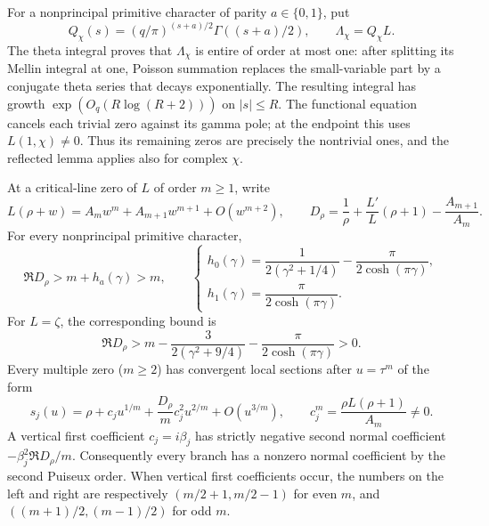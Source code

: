 For a nonprincipal primitive character of parity $a\in\{0,1\}$,
put
\[
 Q_\chi(s)=(q/\pi)^{(s+a)/2}\Gamma((s+a)/2),\qquad
 \Lambda_\chi=Q_\chi L.
\]
The theta integral proves that $\Lambda_\chi$ is entire of
order at most one: after splitting its Mellin integral at one,
Poisson summation replaces the small-variable part by a conjugate
theta series that decays exponentially. The resulting integral
has growth $\exp(O_q(R\log(R+2)))$ on $|s|\le R$.
The functional equation cancels each trivial zero against its
gamma pole; at the endpoint this uses $L(1,\chi)\ne0$.
Thus its remaining zeros are precisely the nontrivial ones,
and the reflected lemma applies also for complex $\chi$.

\begin{proposition}
\label{prop:motion-second-jet}
At a critical-line zero of $L$ of order $m\ge1$, write
\[
 L(\rho+w)=A_mw^m+A_{m+1}w^{m+1}+O(w^{m+2}),\qquad
 D_\rho=\frac1\rho+\frac{L'}L(\rho+1)-\frac{A_{m+1}}{A_m}.
\]
For every nonprincipal primitive character,
\begin{equation}\label{eq:dirichlet-bending-positive-new}
 \Re D_\rho>m+h_a(\gamma)>m,
 \qquad
 \begin{cases}
 h_0(\gamma)=\dfrac1{2(\gamma^2+1/4)}
                  -\dfrac\pi{2\cosh(\pi\gamma)},\\[4pt]
 h_1(\gamma)=\dfrac\pi{2\cosh(\pi\gamma)}.
 \end{cases}
\end{equation}
For $L=\zeta$, the corresponding bound is
\begin{equation}\label{eq:zeta-bending-positive-new}
 \Re D_\rho>m-\frac3{2(\gamma^2+9/4)}
                    -\frac\pi{2\cosh(\pi\gamma)}>0.
\end{equation}
Every multiple zero ($m\ge2$) has convergent local sections
after $u=\tau^m$ of the form
\begin{equation}\label{eq:multiple-bending-jets-new}
 s_j(u)=\rho+c_j u^{1/m}
              +\frac{D_\rho}{m}c_j^2u^{2/m}+O(u^{3/m}),
 \qquad c_j^m=\frac{\rho L(\rho+1)}{A_m}\ne0.
\end{equation}
A vertical first coefficient $c_j=i\beta_j$ has strictly
negative second normal coefficient
$-\beta_j^2\Re D_\rho/m$. Consequently every branch has
a nonzero normal coefficient by the second Puiseux order.
When vertical first coefficients occur, the numbers on the
left and right are respectively $(m/2+1,m/2-1)$ for even $m$,
and $((m+1)/2,(m-1)/2)$ for odd $m$.
\end{proposition}

